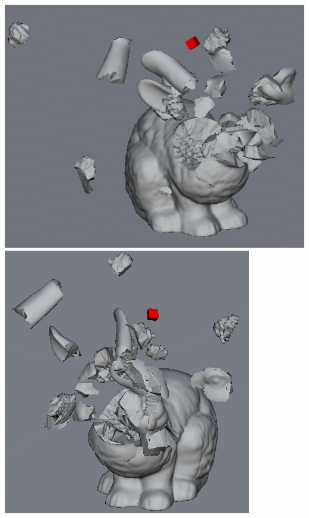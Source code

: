 \centerline{\includegraphics[scale=0.7]{voxel_exploded.png}\includegraphics[scale=0.686]{voxel_exploded2.png}}